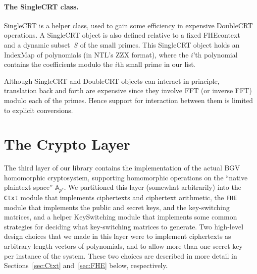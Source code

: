 \documentclass[14pt]{extarticle}
\newcommand{\A}{\mathbb{A}}
\def\IndexMap{\textsf{IndexMap}}
\def\SingleCRT{\textsf{SingleCRT}}
\def\DoubleCRT{\textsf{DoubleCRT}}
\def\FHEcontext{\textsf{FHEcontext}}
\def\KeySwitching{\textsf{KeySwitching}}
\begin{document}
\paragraph{The {\SingleCRT} class.}\label{sec:SingleCRT}
{\SingleCRT} is a helper class, used to gain some efficiency in
expensive {\DoubleCRT} operations. A {\SingleCRT} object is also defined
relative to a fixed {\FHEcontext} and a dynamic subset~$S$ of the small
primes. This {\SingleCRT} object holds an {\IndexMap} of polynomials
(in NTL's ZZX format), where the $i$'th polynomial contains the
coefficients modulo the $i$th small prime in our list.

Although {\SingleCRT} and {\DoubleCRT} objects can interact in
principle, translation back and forth are expensive since they involve
FFT (or inverse FFT) modulo each of the primes. Hence support for
interaction between them is limited to explicit conversions.

\section{The Crypto Layer} \label{sec:crypto}
The third layer of our library contains the implementation of the
actual BGV homomorphic cryptosystem, supporting homomorphic operations
on the ``native plaintext space'' $\A_{p^r}$. We
partitioned this layer (somewhat arbitrarily) into the \texttt{Ctxt}
module that implements ciphertexts and ciphertext arithmetic, the
\texttt{FHE} module that implements the public and secret keys, and
the key-switching matrices, and a helper {\KeySwitching} module that
implements some common strategies for deciding what key-switching
matrices to generate. Two high-level design
choices that we made in this layer were to implement ciphertexts as
arbitrary-length vectors of polynomials, and to allow more than one
secret-key per instance of the system. These two choices are described
in more detail in Sections~\ref{sec:Ctxt} and~\ref{sec:FHE} below,
respectively.

\end{document}
